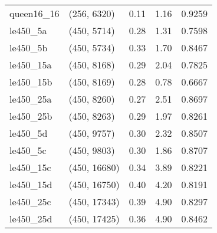 \begin{tabular}{llrrr}
queen16\_16 &  (256, 6320) &      0.11 &     1.16 & 0.9259 \\
  le450\_5a &  (450, 5714) &      0.28 &     1.31 & 0.7598 \\
  le450\_5b &  (450, 5734) &      0.33 &     1.70 & 0.8467 \\
 le450\_15a &  (450, 8168) &      0.29 &     2.04 & 0.7825 \\
 le450\_15b &  (450, 8169) &      0.28 &     0.78 & 0.6667 \\
 le450\_25a &  (450, 8260) &      0.27 &     2.51 & 0.8697 \\
 le450\_25b &  (450, 8263) &      0.29 &     1.97 & 0.8261 \\
  le450\_5d &  (450, 9757) &      0.30 &     2.32 & 0.8507 \\
  le450\_5c &  (450, 9803) &      0.30 &     1.86 & 0.8707 \\
 le450\_15c & (450, 16680) &      0.34 &     3.89 & 0.8221 \\
 le450\_15d & (450, 16750) &      0.40 &     4.20 & 0.8191 \\
 le450\_25c & (450, 17343) &      0.39 &     4.90 & 0.8297 \\
 le450\_25d & (450, 17425) &      0.36 &     4.90 & 0.8462 \\
\bottomrule
\end{tabular}
